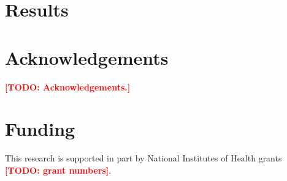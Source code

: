 \documentclass[11pt]{article}
\theoremstyle{plain}
\newcommand{\fref}[1]{Figure~\ref{#1}}
\def\todo#1{\textbf{\textcolor{red}{ [TODO: #1]}}}
\begin{document}
\clearpage




\section*{Results}











\section*{Acknowledgements}
\todo{Acknowledgements.}

\section*{Funding}
This research is supported in part by National Institutes of Health grants
\todo{grant numbers}.


\clearpage
\printbibliography[category=maincited,title={References}]
\newpage






\clearpage

\end{document}
